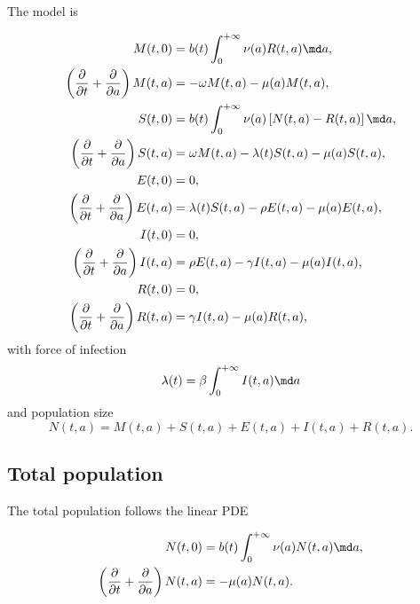 \documentclass{jpmarticle}
\let\subequationsorig\subequations%
\let\endsubequationsorig\endsubequations%
\renewenvironment{subequations}{
  \subequationsorig
  \renewcommand{\theequation}{\theparentequation.\arabic{equation}}
}{
  \endsubequationsorig
}
\begin{document}
The model is
\begin{subequations}
  \label{model_age_structured}
  \begin{align}
    M(t, 0)
    &= b(t) \int_0^{+\infty} \nu(a) R(t, a) \md a,
    \\
    \left(\frac{\partial}{\partial t}
      + \frac{\partial}{\partial a}\right)
    M(t, a)
    &= - \omega M(t, a) - \mu(a) M(t, a),
    \\
    S(t, 0)
    &= b(t) \int_0^{+\infty} \nu(a) \left[N(t, a) - R(t, a)\right] \md a,
    \\
    \left(\frac{\partial}{\partial t}
      + \frac{\partial}{\partial a}\right)
    S(t, a)
    &= \omega M(t, a) - \lambda(t) S(t, a) - \mu(a) S(t, a),
    \\
    E(t, 0)
    &= 0,
    \\
    \left(\frac{\partial}{\partial t}
      + \frac{\partial}{\partial a}\right)
    E(t, a)
    &= \lambda(t) S(t, a) - \rho E(t, a) - \mu(a) E(t, a),
    \\
    I(t, 0)
    &= 0,
    \\
    \left(\frac{\partial}{\partial t}
      + \frac{\partial}{\partial a}\right)
    I(t, a)
    &= \rho E(t, a) - \gamma I(t, a) - \mu(a) I(t, a),
    \\
    R(t, 0)
    &= 0,
    \\
    \left(\frac{\partial}{\partial t}
      + \frac{\partial}{\partial a}\right)
    R(t, a)
    &= \gamma I(t, a) - \mu(a) R(t, a),
  \end{align}
  with force of infection
  \begin{equation}
    \lambda(t) = \beta \int_0^{+\infty} I(t, a) \md a
  \end{equation}
  and population size
  \begin{equation}
    N(t, a) = M(t, a) + S(t, a) + E(t, a) + I(t, a) + R(t, a).
  \end{equation}
\end{subequations}


\subsection{Total population}

The total population follows the linear PDE
\begin{subequations}
  \begin{align}
    N(t, 0)
    &= b(t) \int_0^{+\infty} \nu(a) N(t, a) \md a,
    \\
    \left(\frac{\partial}{\partial t}
      + \frac{\partial}{\partial a}\right)
    N(t, a)
    &= - \mu(a) N(t, a).
  \end{align}
\end{subequations}
\end{document}
